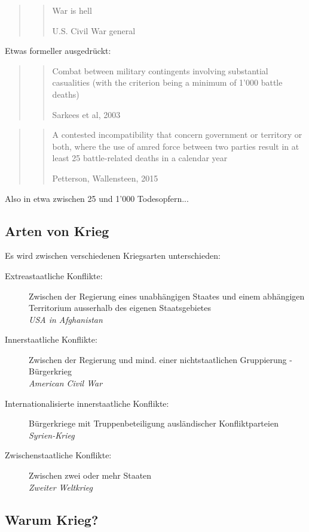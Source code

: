 \documentclass[a4paper, 11pt]{article}
\begin{document}
\begin{quote}
	\centering
	\blockquote[U.S. Civil War general]{War is hell}
\end{quote}

Etwas formeller ausgedrückt:

\begin{quote}
	\centering
	\blockquote[Sarkees et al, 2003]{Combat between military contingents involving substantial casualities (with the criterion being a minimum of 1'000 battle deaths)}
\end{quote}

\begin{quote}
	\centering
	\blockquote[Petterson, Wallensteen, 2015]{A contested incompatibility that concern government or territory or both, where the use of amred force between two parties result in at least 25 battle-related deaths in a calendar year}
\end{quote}

Also in etwa zwischen 25 und 1'000 Todesopfern... 


\subsection{Arten von Krieg}

Es wird zwischen verschiedenen Kriegsarten unterschieden:

\begin{description}
	\item[Extreastaatliche Konflikte: ] Zwischen der Regierung eines unabhängigen Staates und einem abhängigen Territorium ausserhalb des eigenen Staatsgebietes \\
		\textit{USA in Afghanistan}
	\item[Innerstaatliche Konflikte: ] Zwischen der Regierung und mind. einer nichtstaatlichen Gruppierung - Bürgerkrieg \\
		\textit{American Civil War}
	\item[Internationalisierte innerstaatliche Konflikte: ] Bürgerkriege mit Truppenbeteiligung ausländischer Konfliktparteien \\
		\textit{Syrien-Krieg}
	\item[Zwischenstaatliche Konflikte: ] Zwischen zwei oder mehr Staaten \\
		\textit{Zweiter Weltkrieg}
\end{description}


\subsection{Warum Krieg?}
\end{document}

